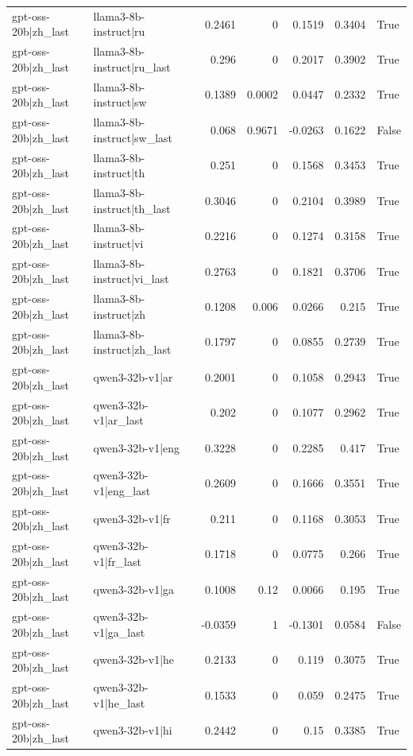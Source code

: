 \begin{table}
\begin{tabular}{l l r r r r l}
gpt-oss-20b|zh_last & llama3-8b-instruct|ru & 0.2461 & 0 & 0.1519 & 0.3404 & True \\
gpt-oss-20b|zh_last & llama3-8b-instruct|ru_last & 0.296 & 0 & 0.2017 & 0.3902 & True \\
gpt-oss-20b|zh_last & llama3-8b-instruct|sw & 0.1389 & 0.0002 & 0.0447 & 0.2332 & True \\
gpt-oss-20b|zh_last & llama3-8b-instruct|sw_last & 0.068 & 0.9671 & -0.0263 & 0.1622 & False \\
gpt-oss-20b|zh_last & llama3-8b-instruct|th & 0.251 & 0 & 0.1568 & 0.3453 & True \\
gpt-oss-20b|zh_last & llama3-8b-instruct|th_last & 0.3046 & 0 & 0.2104 & 0.3989 & True \\
gpt-oss-20b|zh_last & llama3-8b-instruct|vi & 0.2216 & 0 & 0.1274 & 0.3158 & True \\
gpt-oss-20b|zh_last & llama3-8b-instruct|vi_last & 0.2763 & 0 & 0.1821 & 0.3706 & True \\
gpt-oss-20b|zh_last & llama3-8b-instruct|zh & 0.1208 & 0.006 & 0.0266 & 0.215 & True \\
gpt-oss-20b|zh_last & llama3-8b-instruct|zh_last & 0.1797 & 0 & 0.0855 & 0.2739 & True \\
gpt-oss-20b|zh_last & qwen3-32b-v1|ar & 0.2001 & 0 & 0.1058 & 0.2943 & True \\
gpt-oss-20b|zh_last & qwen3-32b-v1|ar_last & 0.202 & 0 & 0.1077 & 0.2962 & True \\
gpt-oss-20b|zh_last & qwen3-32b-v1|eng & 0.3228 & 0 & 0.2285 & 0.417 & True \\
gpt-oss-20b|zh_last & qwen3-32b-v1|eng_last & 0.2609 & 0 & 0.1666 & 0.3551 & True \\
gpt-oss-20b|zh_last & qwen3-32b-v1|fr & 0.211 & 0 & 0.1168 & 0.3053 & True \\
gpt-oss-20b|zh_last & qwen3-32b-v1|fr_last & 0.1718 & 0 & 0.0775 & 0.266 & True \\
gpt-oss-20b|zh_last & qwen3-32b-v1|ga & 0.1008 & 0.12 & 0.0066 & 0.195 & True \\
gpt-oss-20b|zh_last & qwen3-32b-v1|ga_last & -0.0359 & 1 & -0.1301 & 0.0584 & False \\
gpt-oss-20b|zh_last & qwen3-32b-v1|he & 0.2133 & 0 & 0.119 & 0.3075 & True \\
gpt-oss-20b|zh_last & qwen3-32b-v1|he_last & 0.1533 & 0 & 0.059 & 0.2475 & True \\
gpt-oss-20b|zh_last & qwen3-32b-v1|hi & 0.2442 & 0 & 0.15 & 0.3385 & True \\

\end{tabular}
\end{table}
